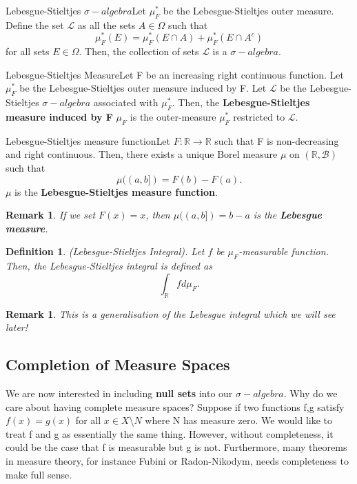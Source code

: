 \documentclass[twoside]{article}
\newtheorem{definition}[theorem]{Definition}
\newtheorem{remark}[theorem]{Remark}
\newcommand{\borelsigmaalgebra}{\mathcal{B}}
\newcommand{\sa}{\sigma-algebra}
\begin{document}
\begin{definition_exam}{Lebesgue-Stieltjes $\sa$}{}Let $\mu_{F}^*$ be the Lebesgue-Stieltjes outer measure. Define the set $\mathcal{L}$ as all the sets $A \in \Omega$ such that 
$$
\mu_{F}^{*}(E) = \mu_{F}^{*}(E \cap A) + \mu_{F}^{*}(E \cap A^c)
$$
for all sets $E \in \Omega$. Then, the collection of sets $\mathcal{L}$ is a $\sa$.
\end{definition_exam}

\begin{proposition_exam}{Lebesgue-Stieltjes Measure}{}Let F be an increasing right continuous function. Let $\mu_F^*$ be the Lebesgue-Stieltjes outer measure induced by F. Let $\mathcal{L}$ be the Lebesgue-Stieltjes $\sa$ associated with $\mu_F^*$. Then, the \textbf{Lebesgue-Stieltjes measure induced by F} $\mu_F$ is the outer-measure $\mu_F^{*}$ restricted to $\mathcal{L}.$
\end{proposition_exam}

\begin{theorem_exam}{Lebesgue-Stieltjes measure function}{}Let $F: \mathbb{R} \rightarrow \mathbb{R}$ such that F is non-decreasing and right continuous. Then, there exists a unique Borel measure $\mu$ on $(\mathbb{R}, \borelsigmaalgebra)$ such that 
$$
\mu((a,b]) = F(b) - F(a).
$$
$\mu$ is the \textbf{Lebesgue-Stieltjes measure function}.
\end{theorem_exam}

\begin{remark}If we set $F(x) = x$, then $\mu((a,b]) = b - a$ is the \textbf{Lebesgue measure}.
\end{remark}

\begin{definition}(Lebesgue-Stieltjes Integral). Let $f$ be $\mu_F$-measurable function. Then, the Lebesgue-Stieltjes integral is defined as 
$$
\int_{\mathbb{R}}fd\mu_F.
$$
\end{definition}

\begin{remark}This is a generalisation of the Lebesgue integral which we will see later!
\end{remark}


\subsection{Completion of Measure Spaces}
We are now interested in including \textbf{null sets} into our $\sa$. Why do we care about having complete measure spaces? Suppose if two functions f,g satisfy $f(x) = g(x)$ for all $x \in X$\textbackslash $N$ where N has measure zero. We would like to treat f and g as essentially the same thing. However, without completeness, it could be the case that f is measurable but g is not. Furthermore, many theorems in measure theory, for instance Fubini or Radon-Nikodym, needs completeness to make full sense.
\end{document}
